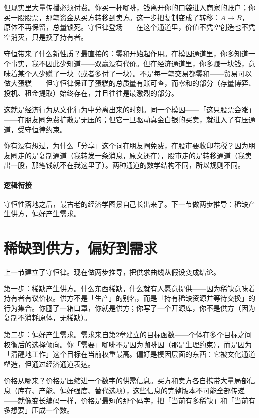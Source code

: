 \documentclass[../../main2.tex]{subfiles}
\begin{document}
	但现实里大量传播必须付费。你买一杯咖啡，钱离开你的口袋进入商家的账户；你买一股股票，那笔资金从买方转移到卖方。这一步把复制变成了转移：$A \to B$，原体不再保留，总量锁死。守恒律登场——在这个通道里，价值不凭空创造也不凭空消灭，只是换了持有者。

	守恒带来了什么新性质？最直接的：零和开始起作用。在模因通道里，你多知道一个事实，我不因此少知道——双赢没有代价。但在经济通道里，你多赚一块钱，意味着某个人少赚了一块（或者多付了一块）。不是每一笔交易都零和——贸易可以做大蛋糕——但守恒律保证了蛋糕的总质量有账可查，而零和的部分（存量博弈、投机、租金提取）始终存在，并且往往是最激烈的部分。

	这就是经济行为从文化行为中分离出来的时刻。同一个模因——「这只股票会涨」——在朋友圈免费扩散是无压的；但它一旦驱动真金白银的买卖，就进入了有压通道，受守恒律约束。

	\begin{readingnote}
		你有没有想过，为什么「分享」这个词在朋友圈免费，在股市要收印花税？因为朋友圈走的是复制通道（我转发一条消息，原文还在），股市走的是转移通道（我卖出一股，那笔钱就不在我这里了）。两种通道的数学结构不同，所以规则不同。
	\end{readingnote}

	\paragraph*{逻辑衔接}
	守恒性落地之后，最古老的经济学图景自己长出来了。下一节做两步推导：稀缺产生供方，偏好产生需求。

	\section{稀缺到供方，偏好到需求}
	\label{sec:econ-supplydemand}

	上一节建立了守恒律。现在做两步推导，把供求曲线从假设变成结论。

	第一步：稀缺产生供方。什么东西稀缺，什么就有人愿意提供——因为稀缺意味着持有者有议价权。供方不是「生产」的别名，而是「持有稀缺资源并等待交换」的行为集合。你囤了一箱口罩，你就是供方；你写了一个开源库，你不是供方（因为复制不消耗原体，无稀缺）。

	第二步：偏好产生需求。需求来自第2章建立的目标函数——个体在多个目标之间权衡后的选择倾向。你「需要」咖啡不是因为咖啡因（那是生理约束），而是因为「清醒地工作」这个目标在当前权重最高。偏好是模因层面的东西：它被文化通道塑造，但通过经济通道表达。

	价格从哪来？价格是压缩进一个数字的供需信息。买方和卖方各自携带大量局部信息（库存、产能、偏好强度、替代选项），这些信息的完整版本不可能全部传递——就像变长编码一样，价格是最短的那个码字，把「当前有多稀缺」和「当前有多想要」压成一个数。
\end{document}
